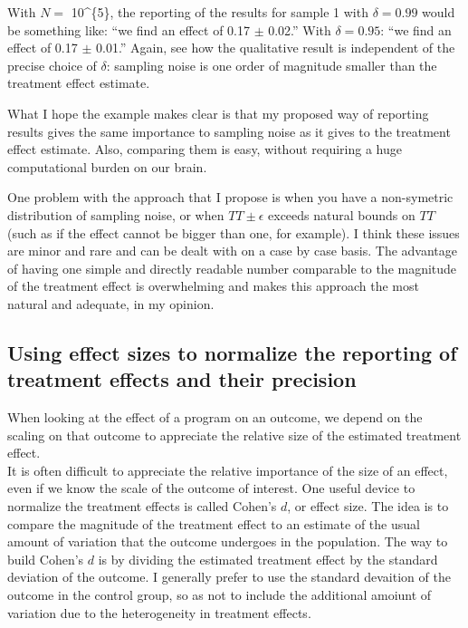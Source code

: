 \documentclass[]{book}
\theoremstyle{definition}
\theoremstyle{definition}
\theoremstyle{definition}
\theoremstyle{remark}
\let\BeginKnitrBlock\begin \let\EndKnitrBlock\end
\begin{document}
With \(N=\) 10\^{}\{5\}, the reporting of the results for sample 1 with
\(\delta=0.99\) would be something like: ``we find an effect of 0.17
\(\pm\) 0.02.'' With \(\delta=0.95\): ``we find an effect of 0.17
\(\pm\) 0.01.'' Again, see how the qualitative result is independent of
the precise choice of \(\delta\): sampling noise is one order of
magnitude smaller than the treatment effect estimate.

\BeginKnitrBlock{remark}
\iffalse{} {Remark. } \fi{}What I hope the example makes clear is that
my proposed way of reporting results gives the same importance to
sampling noise as it gives to the treatment effect estimate. Also,
comparing them is easy, without requiring a huge computational burden on
our brain.
\EndKnitrBlock{remark}

\BeginKnitrBlock{remark}
\iffalse{} {Remark. } \fi{}One problem with the approach that I propose
is when you have a non-symetric distribution of sampling noise, or when
\(TT \pm \epsilon\) exceeds natural bounds on \(TT\) (such as if the
effect cannot be bigger than one, for example). I think these issues are
minor and rare and can be dealt with on a case by case basis. The
advantage of having one simple and directly readable number comparable
to the magnitude of the treatment effect is overwhelming and makes this
approach the most natural and adequate, in my opinion.
\EndKnitrBlock{remark}

\subsection{Using effect sizes to normalize the reporting of treatment
effects and their precision}\label{sec:effectsize}

When looking at the effect of a program on an outcome, we depend on the
scaling on that outcome to appreciate the relative size of the estimated
treatment effect.\\
It is often difficult to appreciate the relative importance of the size
of an effect, even if we know the scale of the outcome of interest. One
useful device to normalize the treatment effects is called Cohen's
\(d\), or effect size. The idea is to compare the magnitude of the
treatment effect to an estimate of the usual amount of variation that
the outcome undergoes in the population. The way to build Cohen's \(d\)
is by dividing the estimated treatment effect by the standard deviation
of the outcome. I generally prefer to use the standard devaition of the
outcome in the control group, so as not to include the additional
amoiunt of variation due to the heterogeneity in treatment effects.
\end{document}
